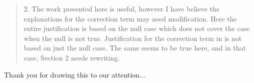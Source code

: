 \documentclass[12pt]{article}
\newenvironment{comment}%
{\begin{quotation}\noindent\small\it\color{darkblue}\ignorespaces%
}{\end{quotation}}
\begin{document}
\begin{comment}
2. The work presented here is useful, however I have believe the explanations
for the correction term may need modification. Here the entire justification is
based on the null case which does not cover the case when the null is not true.
Justification for the correction term in \citet{babu2004goodness} is not based 
on just the
null case. The same seems to be true here, and in that case, Section 2 needs
rewriting.
\end{comment}

Thank you for drawing this to our attention...







\end{document}
